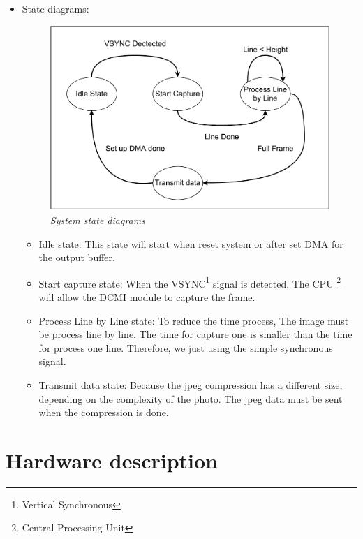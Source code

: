\documentclass[D:/Latex/Internship/Report/Latex/Report.tex]{subfiles}
\begin{document}
\begin{itemize}
			\item State diagrams:
			\begin{figure}[!ht]
			\label{fig:SystemState}
			\centering
			\includegraphics[scale = 0.7]{StateDiagram.pdf}
			\caption{\it System state diagrams}
			\end{figure}	

			\begin{itemize}
				\item Idle state: This state will start when reset system or after set DMA for the output buffer. 
				\item Start capture state: When the VSYNC{\footnote{Vertical Synchronous}} signal is detected, The CPU {\footnote{Central Processing Unit}} will allow the DCMI module to capture the frame.
				\item Process Line by Line state: To reduce the time process, The image must be process line by line. The time for capture one is smaller than the time for process one line. Therefore, we just using the simple synchronous signal.
				\item Transmit data state: Because the jpeg compression has a different size, depending on the complexity of the photo. The jpeg data must be sent when the compression is done. 						
			\end{itemize}							
		\end{itemize}
	\section{Hardware description}
		\label{sec:Hardware description}
\end{document}
